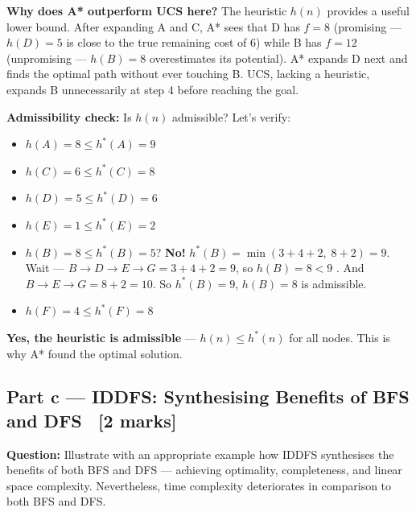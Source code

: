 \documentclass[12pt, a4paper]{article}
\newenvironment{solutionbox}{\begin{mdframed}[style=solutionframe]}{\end{mdframed}}
\newenvironment{notesbox}{\begin{mdframed}[style=notesframe]}{\end{mdframed}}
\begin{document}
\begin{notesbox}
\textbf{Why does A* outperform UCS here?} The heuristic $h(n)$ provides a useful lower bound. After expanding A and C, A* sees that D has $f{=}8$ (promising — $h(D){=}5$ is close to the true remaining cost of 6) while B has $f{=}12$ (unpromising — $h(B){=}8$ overestimates its potential). A* expands D next and finds the optimal path without ever touching B. UCS, lacking a heuristic, expands B unnecessarily at step 4 before reaching the goal.

\textbf{Admissibility check:} Is $h(n)$ admissible? Let's verify:
\begin{itemize}[noitemsep,topsep=3pt]
  \item $h(A){=}8 \leq h^*(A){=}9$ \checkmark
  \item $h(C){=}6 \leq h^*(C){=}8$ \checkmark
  \item $h(D){=}5 \leq h^*(D){=}6$ \checkmark
  \item $h(E){=}1 \leq h^*(E){=}2$ \checkmark
  \item $h(B){=}8 \leq h^*(B){=}5$? \textbf{No!} $h^*(B) = \min(3{+}4{+}2,\; 8{+}2) = 9$. Wait — $B{\to}D{\to}E{\to}G = 3{+}4{+}2=9$, so $h(B){=}8 < 9$ \checkmark. And $B{\to}E{\to}G = 8{+}2=10$. So $h^*(B){=}9$, $h(B){=}8$ is admissible.
  \item $h(F){=}4 \leq h^*(F){=}8$ \checkmark
\end{itemize}
\textbf{Yes, the heuristic is admissible} — $h(n) \leq h^*(n)$ for all nodes. This is why A* found the optimal solution.
\end{notesbox}

\subsection{Part c — IDDFS: Synthesising Benefits of BFS and DFS \ [2 marks]}

\begin{solutionbox}
\textbf{Question:} Illustrate with an appropriate example how IDDFS synthesises the benefits of both BFS and DFS — achieving optimality, completeness, and linear space complexity. Nevertheless, time complexity deteriorates in comparison to both BFS and DFS.
\end{solutionbox}

\vspace{0.6em}
\end{document}
